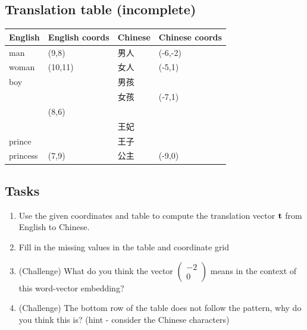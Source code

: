 \documentclass[20pt]{ctexart}
\newcommand{\colvec}[2]{\begin{pmatrix} #1 \\ #2 \end{pmatrix}}
\begin{document}
\subsection*{Translation table (incomplete)}

\begin{center}
\begin{tabular}{@{}llll@{}}
\toprule
English & English coords & Chinese & Chinese coords \\
\midrule
man     & (9,8)  & 男人 & (-6,-2) \\
woman & (10,11) & 女人 & (-5,1) \\
boy     &  & 男孩 &  \\
 &  & 女孩 & (-7,1) \\
 & (8,6)  & &  \\
 & & 王妃 &  \\
prince & & 王子 &  \\
princess & (7,9) & 公主 & (-9,0)  \\


\bottomrule
\end{tabular}
\end{center}



\subsection*{Tasks}

\begin{enumerate}[label=\textbf{\arabic*.}]

\item Use the given coordinates and table to compute the translation vector $\bf{t}$ from English to Chinese.

\vspace{5em}

\item Fill in the missing values in the table and coordinate grid

\vspace{5em}

\item (Challenge) What do you think the vector $\colvec{-2}{0}$ means in the context of this word-vector embedding?

\vspace{5em}

\item (Challenge) The bottom row of the table does not follow the pattern, why do you think this is? (hint - consider the Chinese characters)

\end{enumerate}
\end{document}
